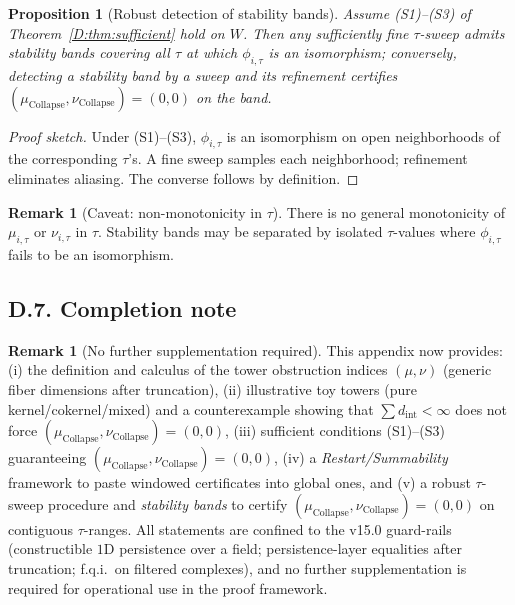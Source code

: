 \documentclass[11pt]{article}
\numberwithin{equation}{section}
\newtheorem{proposition}[theorem]{Proposition}
\theoremstyle{definition}
\newtheorem{remark}[theorem]{Remark}
\DeclareRobustCommand{\muc}{\mu_{\mathrm{Collapse}}}
\DeclareRobustCommand{\nuc}{\nu_{\mathrm{Collapse}}}
\begin{document}
\begin{proposition}[Robust detection of stability bands]\label{D:prop:robust-band}
Assume (S1)–(S3) of Theorem~\ref{D:thm:sufficient} hold on \(W\). Then any sufficiently fine \(\tau\)-sweep admits stability bands covering all \(\tau\) at which \(\phi_{i,\tau}\) is an isomorphism; conversely, detecting a stability band by a sweep and its refinement certifies \((\muc,\nuc)=(0,0)\) on the band.
\end{proposition}

\begin{proof}[Proof sketch]
Under (S1)–(S3), \(\phi_{i,\tau}\) is an isomorphism on open neighborhoods of the corresponding \(\tau\)’s. A fine sweep samples each neighborhood; refinement eliminates aliasing. The converse follows by definition.
\end{proof}

\begin{remark}[Caveat: non-monotonicity in \(\tau\)]
There is no general monotonicity of \(\mu_{i,\tau}\) or \(\nu_{i,\tau}\) in \(\tau\). Stability bands may be separated by isolated \(\tau\)-values where \(\phi_{i,\tau}\) fails to be an isomorphism.
\end{remark}

\subsection*{D.7. Completion note}

\begin{remark}[No further supplementation required]
This appendix now provides: (i) the definition and calculus of the tower obstruction indices \((\mu,\nu)\) (generic fiber dimensions after truncation), (ii) illustrative toy towers (pure kernel/cokernel/mixed) and a counterexample showing that \(\sum d_{\mathrm{int}}<\infty\) does not force \((\muc,\nuc)=(0,0)\), (iii) sufficient conditions (S1)–(S3) guaranteeing \((\muc,\nuc)=(0,0)\), (iv) a \emph{Restart/Summability} framework to paste windowed certificates into global ones, and (v) a robust \(\tau\)-sweep procedure and \emph{stability bands} to certify \((\muc,\nuc)=(0,0)\) on contiguous \(\tau\)-ranges. All statements are confined to the v15.0 guard-rails (constructible \(1\)D persistence over a field; persistence-layer equalities after truncation; f.q.i.\ on filtered complexes), and no further supplementation is required for operational use in the proof framework.
\end{remark}
\end{document}
